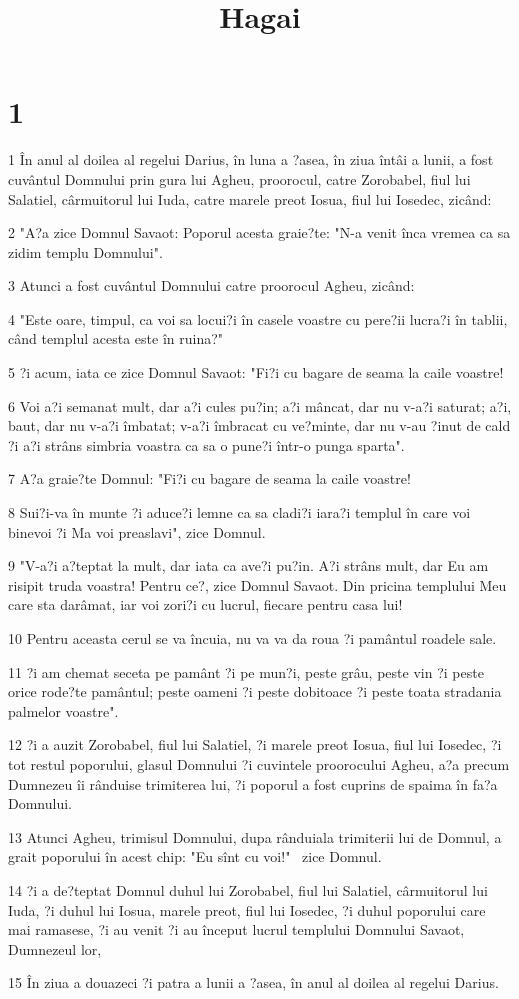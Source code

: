 

\title{Hagai}


\chapter{1}

\par 1 În anul al doilea al regelui Darius, în luna a ?asea, în ziua întâi a lunii, a fost cuvântul Domnului prin gura lui Agheu, proorocul, catre Zorobabel, fiul lui Salatiel, cârmuitorul lui Iuda, catre marele preot Iosua, fiul lui Iosedec, zicând:
\par 2 "A?a zice Domnul Savaot: Poporul acesta graie?te: "N-a venit înca vremea ca sa zidim templu Domnului".
\par 3 Atunci a fost cuvântul Domnului catre proorocul Agheu, zicând:
\par 4 "Este oare, timpul, ca voi sa locui?i în casele voastre cu pere?ii lucra?i în tablii, când templul acesta este în ruina?"
\par 5 ?i acum, iata ce zice Domnul Savaot: "Fi?i cu bagare de seama la caile voastre!
\par 6 Voi a?i semanat mult, dar a?i cules pu?in; a?i mâncat, dar nu v-a?i saturat; a?i, baut, dar nu v-a?i îmbatat; v-a?i îmbracat cu ve?minte, dar nu v-au ?inut de cald ?i a?i strâns simbria voastra ca sa o pune?i într-o punga sparta".
\par 7 A?a graie?te Domnul: "Fi?i cu bagare de seama la caile voastre!
\par 8 Sui?i-va în munte ?i aduce?i lemne ca sa cladi?i iara?i templul în care voi binevoi ?i Ma voi preaslavi", zice Domnul.
\par 9 "V-a?i a?teptat la mult, dar iata ca ave?i pu?in. A?i strâns mult, dar Eu am risipit truda voastra! Pentru ce?, zice Domnul Savaot. Din pricina templului Meu care sta darâmat, iar voi zori?i cu lucrul, fiecare pentru casa lui!
\par 10 Pentru aceasta cerul se va încuia, nu va va da roua ?i pamântul roadele sale.
\par 11 ?i am chemat seceta pe pamânt ?i pe mun?i, peste grâu, peste vin ?i peste orice rode?te pamântul; peste oameni ?i peste dobitoace ?i peste toata stradania palmelor voastre".
\par 12 ?i a auzit Zorobabel, fiul lui Salatiel, ?i marele preot Iosua, fiul lui Iosedec, ?i tot restul poporului, glasul Domnului ?i cuvintele proorocului Agheu, a?a precum Dumnezeu îi rânduise trimiterea lui, ?i poporul a fost cuprins de spaima în fa?a Domnului.
\par 13 Atunci Agheu, trimisul Domnului, dupa rânduiala trimiterii lui de Domnul, a grait poporului în acest chip: "Eu sînt cu voi!"  zice Domnul.
\par 14 ?i a de?teptat Domnul duhul lui Zorobabel, fiul lui Salatiel, cârmuitorul lui Iuda, ?i duhul lui Iosua, marele preot, fiul lui Iosedec, ?i duhul poporului care mai ramasese, ?i au venit ?i au început lucrul templului Domnului Savaot, Dumnezeul lor,
\par 15 În ziua a douazeci ?i patra a lunii a ?asea, în anul al doilea al regelui Darius.

